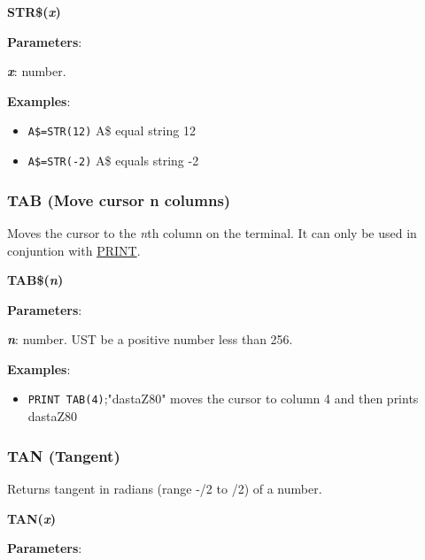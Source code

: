     \hspace{1.9cm}\textbf{STR\$(\textit{x})}

    \textbf{Parameters}:

    \hspace{1cm}\textbf{\textit{x}}: number.

    \textbf{Examples}:
    \begin{itemize}
        \item \texttt{A\$=STR(12)} A\$ equal string 12
        \item \texttt{A\$=STR(-2)} A\$ equals string -2
    \end{itemize}

    \subsubsection{{TAB (Move cursor n columns)}}
    \label{msbasic:lang:tab}
    Moves the cursor to the \textit{n}th column on the terminal. It can only be
    used in conjuntion with \hyperref[msbasic:lang:print]{PRINT}.

    \hspace{1.9cm}\textbf{TAB\$(\textit{n})}

    \textbf{Parameters}:

    \hspace{1cm}\textbf{\textit{n}}: number. UST be a positive number less than
    256.

    \textbf{Examples}:
    \begin{itemize}
        \item \texttt{PRINT TAB(4)};"dastaZ80" moves the cursor to column 4 and
        then prints dastaZ80
    \end{itemize}

    \subsubsection{{TAN (Tangent)}}
    \label{msbasic:lang:tan}
    Returns tangent in radians (range -\textpi/2 to \textpi/2) of a number.

    \hspace{1.9cm}\textbf{TAN(\textit{x})}

    \textbf{Parameters}:

